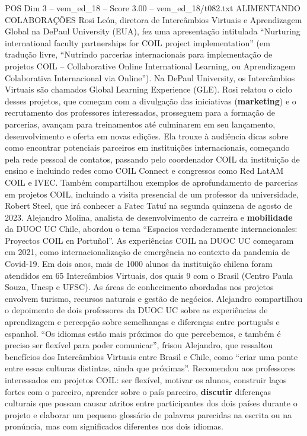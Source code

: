 \begin{textsample}{POS Dim 3 – vem\_ed\_18 – Score 3.00 – vem\_ed\_18/t082.txt}  \label{ex:f3_pos_135}
ALIMENTANDO COLABORAÇÕES Rosi León, diretora de Intercâmbios Virtuais e Aprendizagem Global na DePaul University (EUA), fez uma apresentação intitulada “Nurturing international faculty partnerships for COIL project implementation” (em tradução livre, “Nutrindo parcerias internacionais para implementação de projetos COIL – Collaborative Online International Learning, ou Aprendizagem Colaborativa Internacional via Online”).
Na DePaul University, os Intercâmbios Virtuais são chamados Global Learning Experience (GLE).
Rosi relatou o ciclo desses projetos, que começam com a divulgação das iniciativas (\textbf{marketing}) e o recrutamento dos professores interessados, prosseguem para a formação de parcerias, avançam para treinamentos até culminarem em seu lançamento, desenvolvimento e oferta em novas edições.
Ela trouxe à audiência dicas sobre como encontrar potenciais parceiros em instituições internacionais, começando pela rede pessoal de contatos, passando pelo coordenador COIL da instituição de ensino e incluindo redes como COIL Connect e congressos como Red LatAM COIL e IVEC.
Também compartilhou exemplos de aprofundamento de parcerias em projetos COIL, incluindo a visita presencial de um professor da universidade, Robert Steel, que irá conhecer a Fatec Tatuí na segunda quinzena de agosto de 2023.
Alejandro Molina, analista de desenvolvimento de carreira e \textbf{mobilidade} da DUOC UC Chile, abordou o tema “Espacios verdaderamente internacionales: Proyectos COIL en Portuñol”.
As experiências COIL na DUOC UC começaram em 2021, como internacionalização de emergência no contexto da pandemia de Covid-19.
Em dois anos, mais de 1000 alunos da instituição chilena foram atendidos em 65 Intercâmbios Virtuais, dos quais 9 com o Brasil (Centro Paula Souza, Unesp e UFSC).
As áreas de conhecimento abordadas nos projetos envolvem turismo, recursos naturais e gestão de negócios.
Alejandro compartilhou o depoimento de dois professores da DUOC UC sobre as experiências de aprendizagem e percepção sobre semelhanças e diferenças entre português e espanhol. “Os idiomas estão mais próximos do que percebemos, e também é preciso ser flexível para poder comunicar”, frisou Alejandro, que ressaltou benefícios dos Intercâmbios Virtuais entre Brasil e Chile, como “criar uma ponte entre essas culturas distintas, ainda que próximas”.
Recomendou aos professores interessados em projetos COIL: ser flexível, motivar os alunos, construir laços fortes com o parceiro, aprender sobre o país parceiro, \textbf{discutir} diferenças culturais que possam causar atritos entre participantes dos dois países durante o projeto e elaborar um pequeno glossário de palavras parecidas na escrita ou na pronúncia, mas com significados diferentes nos dois idiomas.

\end{textsample}
